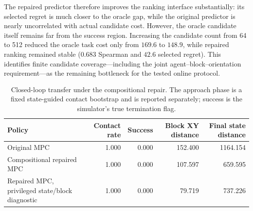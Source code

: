 \documentclass{article}
\begin{document}
\begin{table}[H]
\centering
\scriptsize
\setlength{\tabcolsep}{4pt}
\caption{Matched held-out candidate ranking after compositional repair. Each
row aggregates 16 held-out contact states with 64 identical candidates per
state; intervals are state-bootstrap 95\% intervals. Lower selected regret is
better. The oracle column is a candidate-coverage diagnostic, not a learned
model result.}
\label{tab:supp-compositional-ranking}
\end{table}

The repaired predictor therefore improves the ranking interface substantially:
its selected regret is much closer to the oracle gap, while the original
predictor is nearly uncorrelated with actual candidate cost. However, the
oracle candidate itself remains far from the success region. Increasing the
candidate count from 64 to 512 reduced the oracle task cost only from $169.6$
to $148.9$, while repaired ranking remained stable ($0.683$ Spearman and
$42.6$ selected regret). This identifies finite candidate coverage---including
the joint agent--block--orientation requirement---as the remaining bottleneck
for the tested online protocol.

\begin{table}[H]
\centering
\scriptsize
\setlength{\tabcolsep}{4pt}
\caption{Closed-loop transfer under the compositional repair. The approach
phase is a fixed state-guided contact bootstrap and is reported separately;
success is the simulator's true termination flag.}
\label{tab:supp-compositional-mpc}
\begin{tabular}{lrrrr}
\toprule
Policy & Contact rate & Success & Block XY distance & Final state distance \\
\midrule
Original MPC & 1.000 & 0.000 & 152.400 & 1164.154 \\
Compositional repaired MPC & 1.000 & 0.000 & 107.597 & 659.595 \\
Repaired MPC, privileged state/block diagnostic & 1.000 & 0.000 & 79.719 & 737.226 \\
\bottomrule
\end{tabular}
\end{table}
\end{document}
